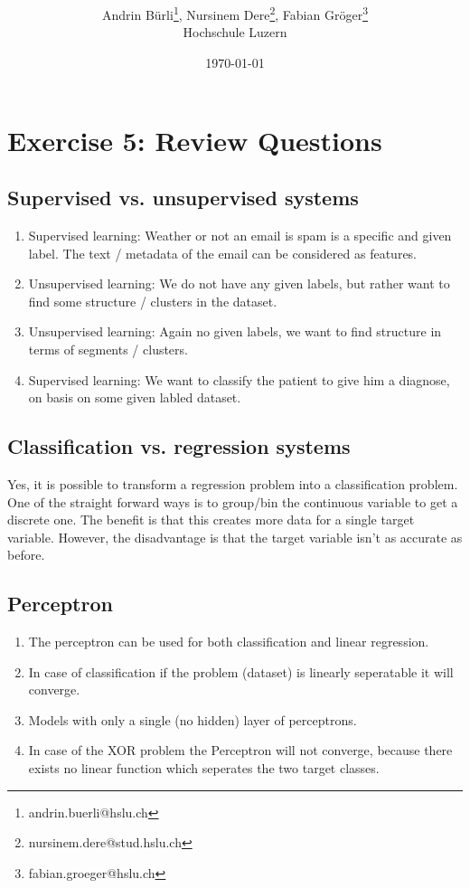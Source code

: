 \documentclass[onecolumn]{article}
\title{\spacecaps{Lab report: SW01 }\\ \normalsize \spacesc{TSM\_DeLearn} }
\author{Andrin Bürli\thanks{andrin.buerli@hslu.ch}, Nursinem Dere\thanks{nursinem.dere@stud.hslu.ch}, Fabian Gröger\thanks{fabian.groeger@hslu.ch}\\Hochschule Luzern}
\date{\today}
\begin{document}
\maketitle

\section{Exercise 5: Review Questions}
\subsection{Supervised vs. unsupervised systems}

\begin{enumerate}[label=(\alph*)]
	\item Supervised learning: Weather or not an email is spam is a specific and given label. The text / metadata of the email can be considered as features.
	\item Unsupervised learning: We do not have any given labels, but rather want to find some structure / clusters in the dataset.
	\item Unsupervised learning: Again no given labels, we want to find structure in terms of segments / clusters.
	\item Supervised learning: We want to classify the patient to give him a diagnose, on basis on some given labled dataset.
\end{enumerate}

\subsection{Classification vs. regression systems}
Yes, it is possible to transform a regression problem into a classification problem. One of the straight forward ways is to group/bin the continuous variable to get a discrete one. The benefit is that this creates more data for a single target variable. However, the disadvantage is that the target variable isn't as accurate as before. 

\subsection{Perceptron}
\begin{enumerate}[label=(\alph*)]
\item  The perceptron can be used for both classification and linear regression.
\item In case of classification if the problem (dataset) is linearly seperatable it will converge.
\item Models with only a single (no hidden) layer of perceptrons.
\item In case of the XOR problem the Perceptron will not converge, because there exists no linear function which seperates the two target classes.

\end{enumerate}
\end{document}
